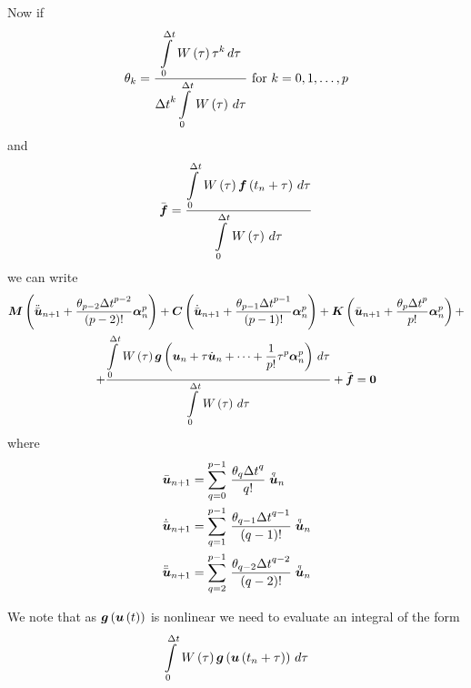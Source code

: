 Now if 
\begin{equation}
  \theta_{k}=\dfrac{  \displaystyle\int\limits_{0}^{\Delta t} \, W\left( \tau \right) \tau^{k}\,d\tau }{{\Delta
      t}^{k}  \displaystyle\int\limits_{0}^{\Delta t} \, W\left( \tau \right) \,d\tau } \text{  for  } k=0,1,\ldots,p
\end{equation}
and
\begin{equation}
  \bar{\vect{f}}=\dfrac{\gint{0}{\Delta
      t}{\fnof{W}{\tau}\fnof{\vect{f}}{t_{n}+\tau}}{\tau}}{
    \gint{0}{\Delta t}{\fnof{W}{\tau}}{\tau}}
  \label{eqn:meanweightedloadvector}
\end{equation}
we can write
\begin{multline}
  \matr{M}\pbrac{\ddot{\bar{\vect{u}}}_{n+1}+\dfrac{\theta_{p-2}{\Delta
        t}^{p-2}}{\factorial{p-2}}\vect{\alpha}^{p}_{n}}+
  \matr{C}\pbrac{\dot{\bar{\vect{u}}}_{n+1}+\dfrac{\theta_{p-1}{\Delta
        t}^{p-1}}{\factorial{p-1}}\vect{\alpha}^{p}_{n}}+
  \matr{K}\pbrac{\bar{\vect{u}}_{n+1}+\dfrac{\theta_{p}{\Delta
        t}^{p}}{p!}\vect{\alpha}^{p}_{n}}+ \\
  + \dfrac{\gint{0}{\Delta t}{\fnof{W}{\tau}\fnof{\vect{g}}{\vect{u}_{n}+\tau\dot{\vect{u}}_{n}+\cdots+
        \dfrac{1}{p!}\tau^{p}\vect{\alpha}^{p}_{n}}}{\tau}}{\gint{0}{\Delta
      t}{\fnof{W}{\tau}}{\tau}}+\bar{\vect{f}}=\vect{0}
  \label{eqn:dynamic1}
\end{multline}
where
\begin{equation}
  \begin{split}
    \bar{\vect{u}}_{n+1} &= \gsum{q=0}{p-1}{\dfrac{\theta_{q}{\Delta
            t}^{q}}{q!}\symover{q}{\vect{u}}_{n}} \\
    \dot{\bar{\vect{u}}}_{n+1} &= \gsum{q=1}{p-1}{\dfrac{\theta_{q-1}{\Delta
            t}^{q-1}}{\factorial{q-1}}\symover{q}{\vect{u}}_{n}} \\
    \ddot{\bar{\vect{u}}}_{n+1} &= \gsum{q=2}{p-1}{\dfrac{\theta_{q-2}{\Delta
            t}^{q-2}}{\factorial{q-2}}\symover{q}{\vect{u}}_{n}} 
  \end{split}
\end{equation}

We note that as $\fnof{\vect{g}}{\fnof{\vect{u}}{t}}$ is nonlinear we need to
evaluate an integral of the form
\begin{equation}
  \gint{0}{\Delta t}{\fnof{W}{\tau}\fnof{\vect{g}}{\fnof{\vect{u}}{t_{n}+\tau}}}{\tau}
\end{equation}


